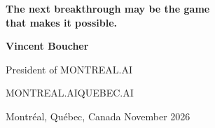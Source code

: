 \documentclass[11pt,letterpaper]{article}
\begin{document}
\begin{titlepage}
\vfill
{\sffamily\bfseries\large The next breakthrough may be the game\\that makes it possible.}\par\vspace{8mm}
{\large\bfseries Vincent Boucher}\par\smallskip
President of MONTREAL.AI\par
MONTREAL.AI\quad\textbullet\quad QUEBEC.AI\par\medskip
{\small\color{white!75}Montr\'eal, Qu\'ebec, Canada\quad\textbullet{} November 2026}
\vspace*{13mm}
\end{titlepage}\nopagecolor\color{ink}\hypersetup{pageanchor=true}








\appendix

\clearpage

\end{document}
